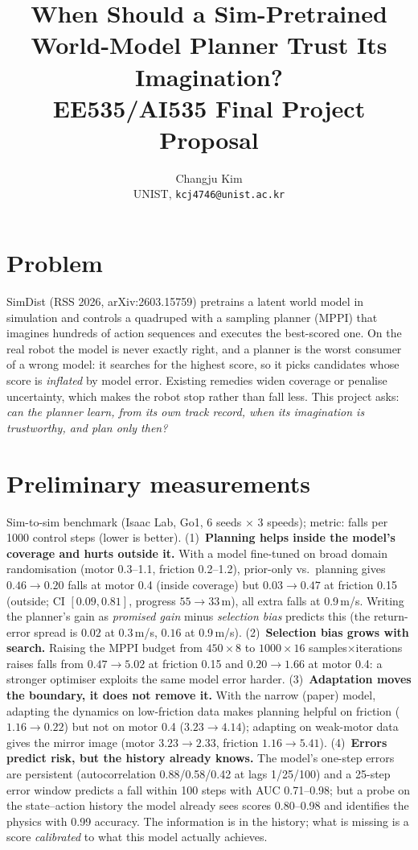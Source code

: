 \documentclass[conference]{IEEEtran}
\title{When Should a Sim-Pretrained World-Model Planner Trust Its Imagination?\\
\large EE535/AI535 Final Project Proposal}
\author{Changju Kim\\ UNIST, \texttt{kcj4746@unist.ac.kr}}
\begin{document}
\maketitle

\section{Problem}
SimDist (RSS 2026, arXiv:2603.15759) pretrains a latent world model in simulation and controls a quadruped with a sampling planner (MPPI) that imagines hundreds of action sequences and executes the best-scored one. On the real robot the model is never exactly right, and a planner is the worst consumer of a wrong model: it searches for the highest score, so it picks candidates whose score is \emph{inflated} by model error. Existing remedies widen coverage or penalise uncertainty, which makes the robot stop rather than fall less. This project asks: \emph{can the planner learn, from its own track record, when its imagination is trustworthy, and plan only then?}

\section{Preliminary measurements}
Sim-to-sim benchmark (Isaac Lab, Go1, 6 seeds $\times$ 3 speeds); metric: falls per 1000 control steps (lower is better).
(1)~\textbf{Planning helps inside the model's coverage and hurts outside it.} With a model fine-tuned on broad domain randomisation (motor 0.3--1.1, friction 0.2--1.2), prior-only vs.\ planning gives $0.46 \to 0.20$ falls at motor 0.4 (inside coverage) but $0.03 \to 0.47$ at friction 0.15 (outside; CI $[0.09, 0.81]$, progress $55 \to 33$\,m), all extra falls at 0.9\,m/s. Writing the planner's gain as \emph{promised gain} minus \emph{selection bias} predicts this (the return-error spread is $0.02$ at 0.3\,m/s, $0.16$ at 0.9\,m/s).
(2)~\textbf{Selection bias grows with search.} Raising the MPPI budget from $450{\times}8$ to $1000{\times}16$ samples$\times$iterations raises falls from $0.47 \to 5.02$ at friction 0.15 and $0.20 \to 1.66$ at motor 0.4: a stronger optimiser exploits the same model error harder.
(3)~\textbf{Adaptation moves the boundary, it does not remove it.} With the narrow (paper) model, adapting the dynamics on low-friction data makes planning helpful on friction ($1.16 \to 0.22$) but not on motor 0.4 ($3.23 \to 4.14$); adapting on weak-motor data gives the mirror image (motor $3.23 \to 2.33$, friction $1.16 \to 5.41$).
(4)~\textbf{Errors predict risk, but the history already knows.} The model's one-step errors are persistent (autocorrelation 0.88/0.58/0.42 at lags 1/25/100) and a 25-step error window predicts a fall within 100 steps with AUC 0.71--0.98; but a probe on the state--action history the model already sees scores 0.80--0.98 and identifies the physics with 0.99 accuracy. The information is in the history; what is missing is a score \emph{calibrated} to what this model actually achieves.
\end{document}
